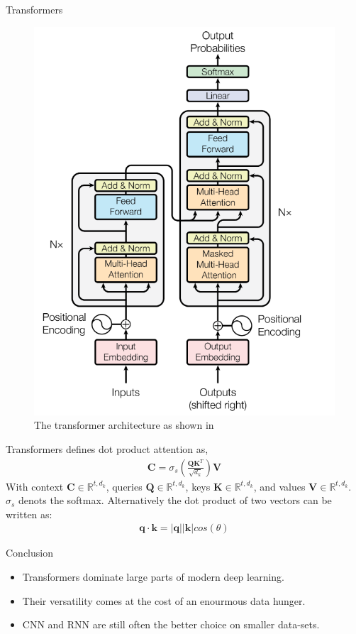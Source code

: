 \documentclass{beamer}
\begin{document}
    \begin{frame}{Transformers}
      \begin{figure}
        \includegraphics[width=.5\linewidth]{figures/transformer.png}
        \caption{The transformer architecture as shown in \cite{vaswani2017attention}}
      \end{figure}
    \end{frame}

    \begin{frame}{Transformers}
      \cite{vaswani2017attention} defines dot product attention as,
      \begin{align}
        \mathbf{C} = \sigma_s(\frac{\mathbf{Q}\mathbf{K}^T}{\sqrt{d_k}})\mathbf{V}
      \end{align}
      With context $\mathbf{C} \in \mathbb{R}^{t,d_k}$, queries $\mathbf{Q} \in \mathbb{R}^{t,d_k}$, keys $\mathbf{K} \in \mathbb{R}^{t,d_k}$,
      and values $ \mathbf{V} \in \mathbb{R}^{t,d_k}$. $ \sigma_s$ denots the softmax.
      Alternatively the dot product of two vectors can be written as:
      \begin{align}
        \mathbf{q} \cdot \mathbf{k} = |\mathbf{q}| |\mathbf{k}| cos(\theta)
      \end{align}
      
    \end{frame}



    \begin{frame}{Conclusion}
      \begin{itemize}
        \item Transformers dominate large parts of modern deep learning.
        \item Their versatility comes at the cost of an enourmous data hunger.
        \item CNN and RNN are still often the better choice on smaller data-sets.
      \end{itemize}
    \end{frame}
\end{document}
